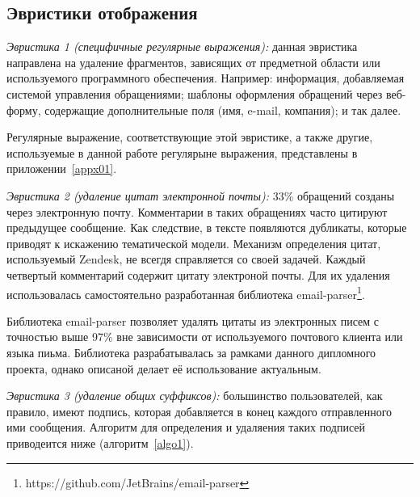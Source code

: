 \subsection{Эвристики отображения}
\label{subsec:lnfheur}

\textit{Эвристика 1 (специфичные регулярные выражения): }  данная эвристика направлена на удаление фрагментов, зависящих от предметной области или используемого программного обеспечения. Например: информация, добавляемая системой управления обращениями; шаблоны оформления обращений через веб-форму, содержащие дополнительные поля (имя, e-mail, компания); и так далее. 

Регулярные выражение, соответствующие этой эвристике, а также другие, используемые в данной работе регулярыне выражения, представлены в приложении~\ref{appx01}.

\textit{Эвристика 2 (удаление цитат электронной почты):} 33\% обращений созданы через электронную почту. Комментарии в таких обращениях часто цитируют предыдущее сообщение. Как следствие, в тексте появляются дубликаты, которые приводят к искажению тематической модели. Механизм определения цитат, используемый Zendesk, не всегдя справляется со своей задачей. Каждый четвертый комментарий содержит цитату электроной почты. Для их удаления использовалась самостоятельно разработанная библиотека email-parser\footnote{https://github.com/JetBrains/email-parser}.

Библиотека email-parser позволяет удалять цитаты из электронных писем с точностью выше 97\% вне зависимости от используемого почтового клиента или языка пиьма. Библиотека разрабатывалась за рамками данного дипломного проекта, однако описаной делает её использование актуальным.

\textit{Эвристика 3 (удаление общих суффиксов):} большинство пользователей, как правило, имеют подпись, которая добавляется в конец каждого отправленного ими сообщения. Алгоритм для определения и удаляения таких подписей приводеится ниже (алгоритм~\ref{algo1}).

